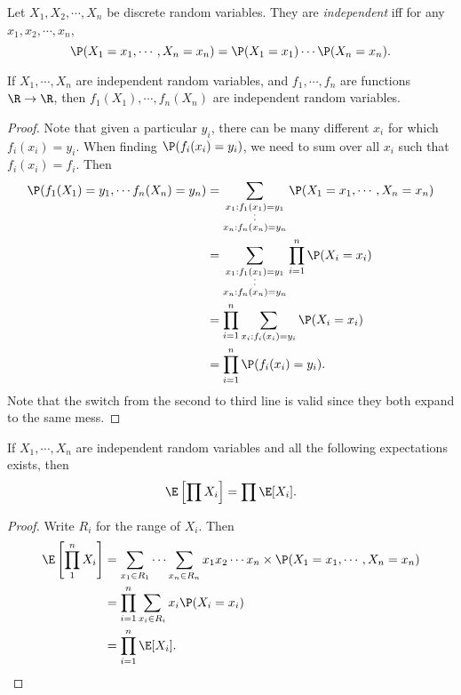 \documentclass[a4paper]{article}
\begin{document}
\begin{defi}
  Let $X_1, X_2, \cdots, X_n$ be discrete random variables. They are \emph{independent} iff for any $x_1, x_2, \cdots, x_n$,
  \[
    \P(X_1 = x_1, \cdots, X_n = x_n) = \P(X_1 = x_1)\cdots \P(X_n = x_n).
  \]
\end{defi}

\begin{thm}
  If $X_1, \cdots, X_n$ are independent random variables, and $f_1, \cdots, f_n$ are functions $\R \to \R$, then $f_1(X_1), \cdots, f_n(X_n)$ are independent random variables.
\end{thm}

\begin{proof}
  Note that given a particular $y_i$, there can be many different $x_i$ for which $f_i(x_i) = y_i$. When finding $\P(f_i(x_i)= y_i)$, we need to sum over all $x_i$ such that $f_i(x_i) = f_i$. Then
  \begin{align*}
    \P(f_1(X_1) = y_1, \cdots f_n(X_n) = y_n) &= \sum_{\substack{x_1: f_1(x_1) = y_1\\\cdot\vspace{-2pt}\\\cdot\\x_n: f_n(x_n) = y_n}} \P(X_1 = x_1, \cdots, X_n = x_n)\\
    &= \sum_{\substack{x_1: f_1(x_1) = y_1\\\cdot\vspace{-2pt}\\\cdot\\x_n: f_n(x_n) = y_n}} \prod_{i = 1}^n \P(X_i = x_i)\\
    &= \prod_{i = 1}^n \sum_{x_i:f_i(x_i) = y_i} \P(X_i = x_i)\\
    &= \prod_{i = 1}^n \P(f_i(x_i) = y_i).
  \end{align*}
  Note that the switch from the second to third line is valid since they both expand to the same mess.
\end{proof}

\begin{thm}
  If $X_1, \cdots, X_n$ are independent random variables and all the following expectations exists, then
  \[
    \E\left[\prod X_i\right] = \prod \E[X_i].
  \]
\end{thm}

\begin{proof}
  Write $R_i$ for the range of $X_i$. Then
  \begin{align*}
    \E\left[\prod_1^n X_i\right] &= \sum_{x_1\in R_1}\cdots \sum_{x_n\in R_n}x_1x_2\cdots x_n\times \P(X_1 = x_1, \cdots, X_n = x_n)\\
    &= \prod_{i = 1}^n \sum_{x_i \in R_i}x_i\P(X_i = x_i)\\
    &= \prod_{i = 1}^n \E[X_i].
  \end{align*}
\end{proof}
\end{document}
